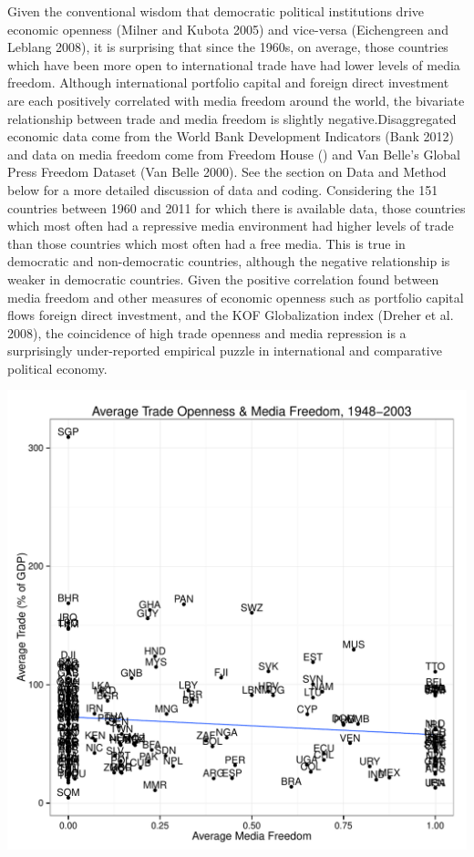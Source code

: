\documentclass[a4paper]{article}\usepackage[]{graphicx}\usepackage[]{color}
\makeatletter
\def\maxwidth{ %
  \ifdim\Gin@nat@width>\linewidth
    \linewidth
  \else
    \Gin@nat@width
  \fi
}
\newenvironment{knitrout}{}{} %
\makeatother
\begin{document}
Given the conventional wisdom that democratic political institutions drive economic openness (Milner and Kubota 2005) and vice-versa (Eichengreen and Leblang 2008), it is surprising that since the 1960s, on average, those countries which have been more open to international trade have had lower levels of media freedom. Although international portfolio capital and foreign direct investment are each positively correlated with media freedom around the world, the bivariate relationship between trade and media freedom is slightly negative.Disaggregated economic data come from the World Bank Development Indicators (Bank 2012) and data on media freedom come from Freedom House () and Van Belle's Global Press Freedom Dataset (Van Belle 2000). See the section on Data and Method below for a more detailed discussion of data and coding. Considering the 151 countries between 1960 and 2011 for which there is available data, those countries which most often had a repressive media environment had higher levels of trade than those countries which most often had a free media. This is true in democratic and non-democratic countries, although the negative relationship is weaker in democratic countries. Given the positive correlation found between media freedom and other measures of economic openness such as portfolio capital flows foreign direct investment, and the KOF Globalization index (Dreher et al. 2008), the coincidence of high trade openness and media repression is a surprisingly under-reported empirical puzzle in international and comparative political economy.


\begin{knitrout}
\color{fgcolor}

{\centering \includegraphics[width=\maxwidth]{figuresintrographs} 

}



\end{knitrout}
\end{document}
